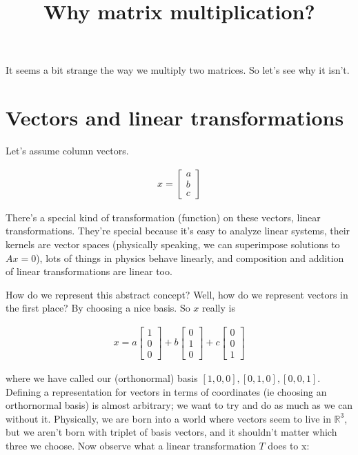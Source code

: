 \documentclass{article}
\title{Why matrix multiplication?}
\date{}
\begin{document}
\maketitle

It seems a bit strange the way we multiply two matrices. So let's see why it isn't.

\section{Vectors and linear transformations}

Let's assume column vectors.

\begin{align}
x
=
\begin{bmatrix}
a \\
b \\
c
\end{bmatrix} 
\end{align}

There's a special kind of transformation (function) on these vectors, linear transformations. They're special because it's easy to analyze linear systems, their kernels are vector spaces (physically speaking, we can superimpose solutions to $Ax = 0$), lots of things in physics behave linearly, and composition and addition of linear transformations are linear too.

How do we represent this abstract concept? Well, how do we represent vectors in the first place? By choosing a nice basis. So $x$ really is

\begin{align}
x
= a
\begin{bmatrix}
1 \\
0 \\
0
\end{bmatrix}
+ b
\begin{bmatrix}
0 \\
1 \\
0
\end{bmatrix}
+ c
\begin{bmatrix}
0 \\
0 \\
1
\end{bmatrix}
\end{align}

where we have called our (orthonormal) basis $[1,0,0], [0,1,0], [0,0,1]$. Defining a representation for vectors in terms of coordinates (ie choosing an orthornormal basis) is almost arbitrary; we want to try and do as much as we can without it. Physically, we are born into a world where vectors seem to live in $\mathbb{R}^3$, but we aren't born with triplet of basis vectors, and it shouldn't matter which three we choose. Now observe what a linear transformation $T$ does to x:
\end{document}
